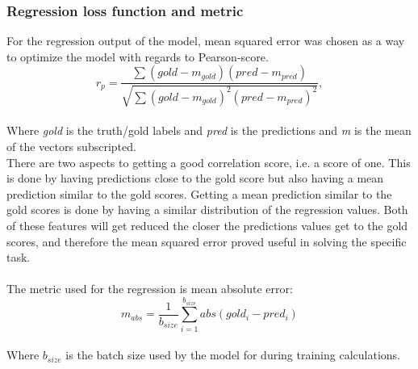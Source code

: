 \subsubsection*{Regression loss function and metric}
For the regression output of the model, mean squared error was chosen as a way to optimize the model with regards to Pearson-score.\\
\begin{equation} \label{eq:pearson}
r_{p} = \dfrac{\sum \left(gold-m_{gold}\right) \left(pred-m_{pred}\right)}{\sqrt{\sum \left(gold-m_{gold}\right)^{2} \left(pred-m_{pred}\right)^{2}}},
\end{equation}\\
Where \textit{gold} is the truth/gold labels and \textit{pred} is the predictions and \textit{m} is the mean of the vectors subscripted.\\
There are two aspects to getting a good correlation score, i.e. a score of one. This is done by having predictions close to the gold score but also having a mean prediction similar to the gold scores. Getting a mean prediction similar to the gold scores is done by having a similar distribution of the regression values. Both of these features will get reduced the closer the predictions values get to the gold scores, and therefore the mean squared error proved useful in solving the specific task.\\
\\
The metric used for the regression is mean absolute error:\\
\begin{equation} \label{eq:meanabs}
m_{abs}=\dfrac{1}{b_{size}}\sum^{b_{size}}_{i=1}abs\left(gold_{i}-pred_{i}\right)
\end{equation}\\
Where $b_{size}$ is the batch size used by the model for during training calculations. 

